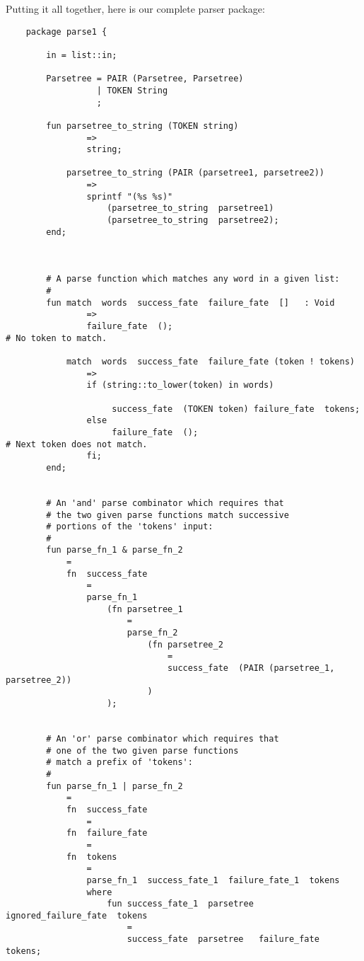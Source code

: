 Putting it all together, here is our complete parser package:

\begin{verbatim}
    package parse1 {

        in = list::in;

        Parsetree = PAIR (Parsetree, Parsetree)
                  | TOKEN String
                  ;

        fun parsetree_to_string (TOKEN string)
                =>
                string;

            parsetree_to_string (PAIR (parsetree1, parsetree2))
                =>
                sprintf "(%s %s)"
                    (parsetree_to_string  parsetree1)
                    (parsetree_to_string  parsetree2);
        end;



        # A parse function which matches any word in a given list:
        #
        fun match  words  success_fate  failure_fate  []   : Void
                =>
                failure_fate  ();                                               # No token to match.

            match  words  success_fate  failure_fate (token ! tokens)
                =>
                if (string::to_lower(token) in words)

                     success_fate  (TOKEN token) failure_fate  tokens;
                else
                     failure_fate  ();                                          # Next token does not match.
                fi;         
        end;


        # An 'and' parse combinator which requires that
        # the two given parse functions match successive
        # portions of the 'tokens' input:
        #
        fun parse_fn_1 & parse_fn_2
            =
            fn  success_fate
                =
                parse_fn_1
                    (fn parsetree_1
                        =
                        parse_fn_2
                            (fn parsetree_2
                                =
                                success_fate  (PAIR (parsetree_1, parsetree_2))
                            )
                    );


        # An 'or' parse combinator which requires that
        # one of the two given parse functions
        # match a prefix of 'tokens':
        #
        fun parse_fn_1 | parse_fn_2
            =
            fn  success_fate
                =
            fn  failure_fate
                =
            fn  tokens
                =
                parse_fn_1  success_fate_1  failure_fate_1  tokens
                where
                    fun success_fate_1  parsetree   ignored_failure_fate  tokens
                        =
                        success_fate  parsetree   failure_fate  tokens;


\end{verbatim}
